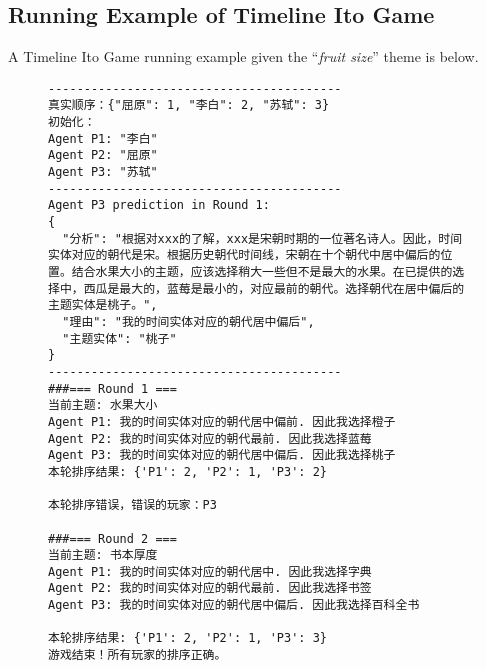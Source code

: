 


\subsection{Running Example of Timeline Ito Game}\label{app:ito-case}
A Timeline Ito Game running example given the ``\textit{fruit size}'' theme is below.
\begin{figure}[H]
\begin{tcolorbox}[title={\textbf{\small A Running Example of Timeline Ito Game}}, colback=whitesmoke, colframe=royalblue(web), boxrule=2pt, arc=0mm]
{\small
\begin{verbatim}
-----------------------------------------
真实顺序：{"屈原": 1, "李白": 2, "苏轼": 3}
初始化：
Agent P1: "李白"
Agent P2: "屈原"
Agent P3: "苏轼"
-----------------------------------------
Agent P3 prediction in Round 1:
{
  "分析": "根据对xxx的了解，xxx是宋朝时期的一位著名诗人。因此，时间实体对应的朝代是宋。根据历史朝代时间线，宋朝在十个朝代中居中偏后的位置。结合水果大小的主题，应该选择稍大一些但不是最大的水果。在已提供的选择中，西瓜是最大的，蓝莓是最小的，对应最前的朝代。选择朝代在居中偏后的主题实体是桃子。",
  "理由": "我的时间实体对应的朝代居中偏后",
  "主题实体": "桃子"
}
-----------------------------------------
###=== Round 1 ===
当前主题: 水果大小
Agent P1: 我的时间实体对应的朝代居中偏前. 因此我选择橙子
Agent P2: 我的时间实体对应的朝代最前. 因此我选择蓝莓
Agent P3: 我的时间实体对应的朝代居中偏后. 因此我选择桃子
本轮排序结果: {'P1': 2, 'P2': 1, 'P3': 2}

本轮排序错误，错误的玩家：P3

###=== Round 2 ===
当前主题: 书本厚度
Agent P1: 我的时间实体对应的朝代居中. 因此我选择字典
Agent P2: 我的时间实体对应的朝代最前. 因此我选择书签
Agent P3: 我的时间实体对应的朝代居中偏后. 因此我选择百科全书

本轮排序结果: {'P1': 2, 'P2': 1, 'P3': 3}
游戏结束！所有玩家的排序正确。
\end{verbatim}
}
\end{tcolorbox}
\label{fig:ito_public_memory_case}
\end{figure}


